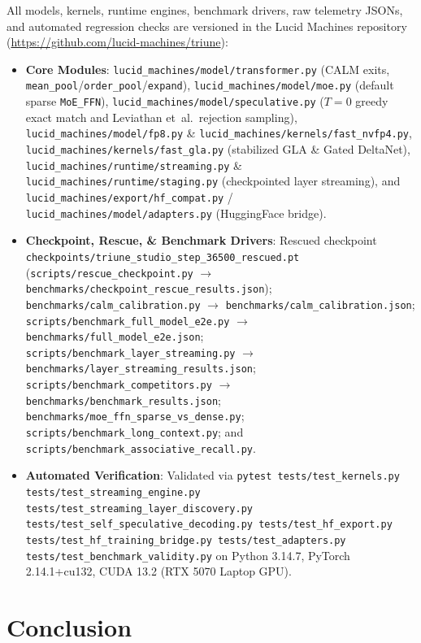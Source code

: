 \documentclass[10pt,twocolumn,letterpaper]{article}
\begin{document}
All models, kernels, runtime engines, benchmark drivers, raw telemetry JSONs, and automated regression checks are versioned in the Lucid Machines repository (\url{https://github.com/lucid-machines/triune}):
\begin{itemize}\raggedright\setlength{\itemsep}{2pt}
    \item \textbf{Core Modules}: \texttt{lucid\_machines/model/transformer.py} (CALM exits, \texttt{mean\_pool}/\texttt{order\_pool}/\texttt{expand}), \texttt{lucid\_machines/model/moe.py} (default sparse \texttt{MoE\_FFN}), \texttt{lucid\_machines/model/speculative.py} ($T=0$ greedy exact match and Leviathan et~al.\ rejection sampling), \texttt{lucid\_machines/model/fp8.py} \& \texttt{lucid\_machines/kernels/fast\_nvfp4.py}, \texttt{lucid\_machines/kernels/fast\_gla.py} (stabilized GLA \& Gated DeltaNet), \texttt{lucid\_machines/runtime/streaming.py} \& \texttt{lucid\_machines/runtime/staging.py} (checkpointed layer streaming), and \texttt{lucid\_machines/export/hf\_compat.py} / \texttt{lucid\_machines/model/adapters.py} (HuggingFace bridge).
    \item \textbf{Checkpoint, Rescue, \& Benchmark Drivers}: Rescued checkpoint \texttt{checkpoints/\allowbreak{}triune\_studio\_step\_36500\_rescued.pt} (\texttt{scripts/rescue\_checkpoint.py} $\to$ \texttt{benchmarks/checkpoint\_rescue\_results.json}); \texttt{benchmarks/calm\_calibration.py} $\to$ \texttt{benchmarks/calm\_calibration.json}; \texttt{scripts/benchmark\_full\_model\_e2e.py} $\to$ \texttt{benchmarks/full\_model\_e2e.json}; \texttt{scripts/benchmark\_layer\_streaming.py} $\to$ \texttt{benchmarks/layer\_streaming\_results.json}; \texttt{scripts/benchmark\_competitors.py} $\to$ \texttt{benchmarks/benchmark\_results.json}; \texttt{benchmarks/moe\_ffn\_sparse\_vs\_dense.py}; \texttt{scripts/benchmark\_long\_context.py}; and \texttt{scripts/benchmark\_associative\_recall.py}.
    \item \textbf{Automated Verification}: Validated via \texttt{pytest tests/test\_kernels.py tests/test\_streaming\_engine.py tests/test\_streaming\_layer\_discovery.py tests/test\_self\_speculative\_decoding.py tests/test\_hf\_export.py tests/test\_hf\_training\_bridge.py tests/test\_adapters.py tests/test\_benchmark\_validity.py} on Python 3.14.7, PyTorch 2.14.1+cu132, CUDA 13.2 (RTX 5070 Laptop GPU).
\end{itemize}

\section{Conclusion}
\end{document}

